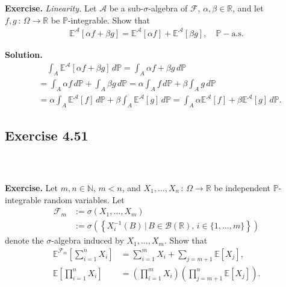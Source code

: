 \documentclass{beamer}
\numberwithin{equation}{section}
\newenvironment{frame2}{\begin{frame}\frametitle{{\normalsize \secname} \\ {\large \subsecname}}}{\end{frame}}
\begin{document}
\begin{frame2}
    \textbf{Exercise.}
    \textit{Linearity.}
    Let $\mathcal{A}$ be a sub-$\sigma$-algebra of $\mathcal{F}$, $\alpha,\beta \in \mathbb{R}$, and let $f,g \, : \, \Omega \rightarrow \mathbb{R}$ be $\mathbb{P}$-integrable.
    Show that
    \begin{align}
        \mathbb{E}^\mathcal{A}[\alpha f + \beta g] = \mathbb{E}^\mathcal{A}[\alpha f] + \mathbb{E}^\mathcal{A}[\beta g], \quad \mathbb{P}-\text{a.s.} 
    \end{align}

    \vspace{10pt}
    \textbf{Solution.}
    \begin{align*}
        &\quad\int_A \mathbb{E}^{\mathcal{A}}\left[\alpha f + \beta g\right] \, d\mathbb{P} = \int_A \alpha f + \beta g \, d\mathbb{P}\\
        &= \int_A \alpha f \, d\mathbb{P} + \int_A \beta g \, d\mathbb{P} =  \alpha \int_A f \, d\mathbb{P} +  \beta \int_A g \, d\mathbb{P} \\
        &= \alpha \int_A \mathbb{E}^{\mathcal{A}}\left[f\right] \, d\mathbb{P} +  \beta \int_A \mathbb{E}^{\mathcal{A}}\left[g\right] \, d\mathbb{P} =  \int_A \alpha \mathbb{E}^{\mathcal{A}}\left[f\right] +  \beta \mathbb{E}^{\mathcal{A}}\left[g\right] \, d\mathbb{P}.
    \end{align*}
\end{frame2}

\subsection{Exercise 4.51}

\begin{frame2}
    \textbf{Exercise.}
    Let $m,n \in \mathbb{N}$, $m < n$, and $X_1, \ldots, X_n \, : \, \Omega \rightarrow \mathbb{R}$ be independent $\mathbb{P}$-integrable random variables.
    Let
    \begin{align}
        \mathcal{F}_m&:=\sigma(X_1,\ldots,X_m)\\
        &:=\sigma\left(\left\{X_i^{-1}(B)\,|\,B\in\mathcal{B}(\mathbb{R}),\, i \in \{1,\ldots,m\} \right\}\right)
    \end{align}
    denote the $\sigma$-algebra induced by $X_1,\ldots,X_m$.
    Show that
    \begin{align}
        \mathbb{E}^{\mathcal{F}_m }\left[ \sum_{i = 1}^n X_i \right] &= \sum_{i=1}^m X_i + \sum_{j = m+1}\mathbb{E}\left[X_j\right], \\
        \mathbb{E}\left[ \prod_{i = 1}^n X_i \right] &= \left(\prod_{i=1}^m X_i\right)\left(\prod_{j=m+1}^n \mathbb{E}[X_j]\right).
    \end{align}

    \vspace{10pt}
\end{frame2}
\end{document}
